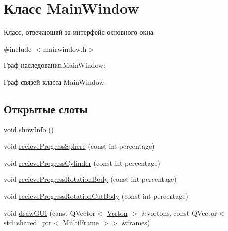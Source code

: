 \hypertarget{class_main_window}{}\section{Класс Main\+Window}
\label{class_main_window}


Класс, отвечающий за интерфейс основного окна  




{\ttfamily \#include $<$mainwindow.\+h$>$}



Граф наследования\+:Main\+Window\+:


Граф связей класса Main\+Window\+:
\subsection*{Открытые слоты}
\begin{DoxyCompactItemize}
\item 
void \mbox{\hyperlink{class_main_window_a75499d93be4aa10581e42eddd7ecd1f7}{show\+Info}} ()
\item 
void \mbox{\hyperlink{class_main_window_a2066789c6e6e98dfd13709a565867f16}{recieve\+Progress\+Sphere}} (const int percentage)
\item 
void \mbox{\hyperlink{class_main_window_ae1943ce8bec1cf91611cf6f827f4cc17}{recieve\+Progress\+Cylinder}} (const int percentage)
\item 
void \mbox{\hyperlink{class_main_window_ad5d102e64cec9e823e16c76097a82e67}{recieve\+Progress\+Rotation\+Body}} (const int percentage)
\item 
void \mbox{\hyperlink{class_main_window_a5d9756062e5b00dbfc83605498716479}{recieve\+Progress\+Rotation\+Cut\+Body}} (const int percentage)
\item 
void \mbox{\hyperlink{class_main_window_a0d01ad34f4f5610bc2e131244ec873cc}{draw\+G\+UI}} (const Q\+Vector$<$ \mbox{\hyperlink{class_vorton}{Vorton}} $>$ \&vortons, const Q\+Vector$<$ std\+::shared\+\_\+ptr$<$ \mbox{\hyperlink{class_multi_frame}{Multi\+Frame}} $>$$>$ \&frames)
\end{DoxyCompactItemize}
